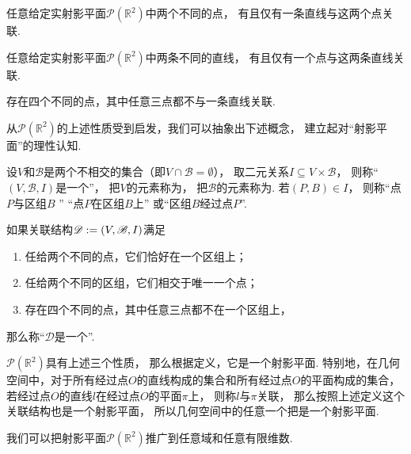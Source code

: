 \begin{property}
任意给定实射影平面\(\mathcal{P}(\mathbb{R}^2)\)中两个不同的点，
有且仅有一条直线与这两个点关联.
\end{property}

\begin{property}
任意给定实射影平面\(\mathcal{P}(\mathbb{R}^2)\)中两条不同的直线，
有且仅有一个点与这两条直线关联.
\end{property}

\begin{property}
存在四个不同的点，其中任意三点都不与一条直线关联.
\end{property}

从\(\mathcal{P}(\mathbb{R}^2)\)的上述性质受到启发，我们可以抽象出下述概念，
建立起对“射影平面”的理性认知.

设\(V\)和\(\mathscr{B}\)是两个不相交的集合（即\(V \cap \mathscr{B} = \emptyset\)），
取二元关系\(I \subseteq V \times \mathscr{B}\)，
则称“\((V,\mathscr{B},I)\)是一个”，
把\(V\)的元素称为，
把\(\mathscr{B}\)的元素称为.
若\((P,B) \in I\)，
则称“点\(P\)与区组\(B\) ”
“点\(P\)在区组\(B\)上”
或“区组\(B\)经过点\(P\)”.

如果关联结构\(\mathscr{D} := (V,\mathscr{B},I)\)满足\begin{enumerate}
	\item 任给两个不同的点，它们恰好在一个区组上；
	\item 任给两个不同的区组，它们相交于唯一一个点；
	\item 存在四个不同的点，其中任意三点都不在一个区组上，
\end{enumerate}
那么称“\(\mathscr{D}\)是一个”.

\(\mathcal{P}(\mathbb{R}^2)\)具有上述三个性质，
那么根据定义，它是一个射影平面.
特别地，在几何空间中，对于所有经过点\(O\)的直线构成的集合和所有经过点\(O\)的平面构成的集合，
若经过点\(O\)的直线\(l\)在经过点\(O\)的平面\(\pi\)上，
则称\(l\)与\(\pi\)关联，
那么按照上述定义这个关联结构也是一个射影平面，
所以几何空间中的任意一个把是一个射影平面.

我们可以把射影平面\(\mathcal{P}(\mathbb{R}^2)\)推广到任意域和任意有限维数.

